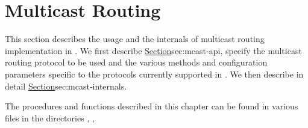 \chapter{Multicast Routing}
\label{chap:multicast}

This section describes the usage and the internals of multicast
routing implementation in \ns.
We first describe 
\href{the user interface to enable multicast routing}{Section}{sec:mcast-api},
specify the multicast routing protocol to be used and the
various methods and configuration parameters specific to the
protocols currently supported in \ns.
We then describe in detail 
\href{the internals and the architecture of the
multicast routing implementation in \ns}{Section}{sec:mcast-internals}.

The procedures and functions described in this chapter can be found in
various files in the directories , ,
